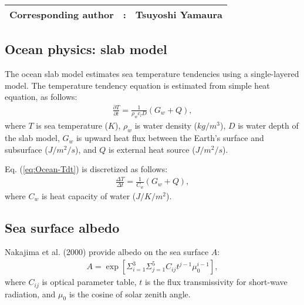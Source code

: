 {\bf \Large 
\begin{tabular}{ccc}
\hline
  Corresponding author & : & Tsuyoshi Yamaura\\
\hline
\end{tabular}
}


\subsection{Ocean physics: slab model}

The ocean slab model estimates sea temperature tendencies using a single-layered model.
The temperature tendency equation is estimated from simple heat equation, as follows:
\begin{align}
  \frac{\partial T}{\partial t} = \frac{1}{\rho_{w}c_{l}D} \left( G_{w} + Q \right),
  \label{eq:Ocean-Tdt}
\end{align}
where
$T$ is sea temperature ($K$),
$\rho_{w}$ is water density ($kg/m^3$),
$D$ is water depth of the slab model,
$G_{w}$ is upward heat flux between the Earth's surface and subsurface ($J/m^2/s$),
and $Q$ is external heat source ($J/m^2/s$).

Eq. (\ref{eq:Ocean-Tdt}) is discretized as follows:
\begin{align}
  \frac{\Delta T}{\Delta t} = \frac{1}{C_{w}} \left( G_{w} + Q \right),
\end{align}
where
$C_{w}$ is heat capacity of water ($J/K/m^2$).

\subsection{Sea surface albedo}
Nakajima et al. (2000) provide albedo on the sea surface $A$:
\begin{align}
  A = \exp \left[ \Sigma_{i=1}^{3} \Sigma_{j=1}^{5} C_{ij} t^{j-1} \mu_0^{i-1} \right],
\end{align}
where
$C_{ij}$ is optical parameter table,
$t$ is the flux transmissivity for short-wave radiation,
and $\mu_0$ is the cosine of solar zenith angle.


